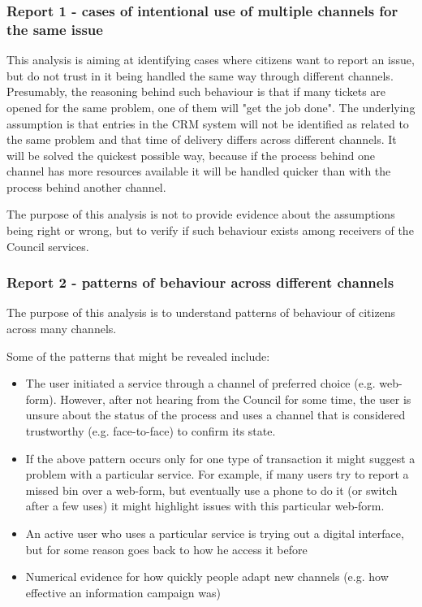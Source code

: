 			\subsubsection{Report 1 - cases of intentional use of multiple channels for the same issue}
			
This analysis is aiming at identifying cases where citizens want to report an issue, but do not trust in it being handled the same way through different channels. Presumably, the reasoning behind such behaviour is that if many tickets are opened for the same problem, one of them will "get the job done". The underlying assumption is that entries in the CRM system will not be identified as related to the same problem and that time of delivery differs across different channels. It will be solved the quickest possible way, because if the process behind one channel has more resources available it will be handled quicker than with the process behind another channel.

The purpose of this analysis is not to provide evidence about the assumptions being right or wrong, but to verify if such behaviour exists among receivers of the Council services.
			
			\subsubsection{Report 2 - patterns of behaviour across different channels}
			
The purpose of this analysis is to understand patterns of behaviour of citizens across many channels.

Some of the patterns that might be revealed include:
\begin{itemize}
\item The user initiated a service through a channel of preferred choice (e.g. web-form). However, after not hearing from the Council for some time, the user is unsure about the status of the process and uses a channel that is considered trustworthy (e.g. face-to-face) to confirm its state.
\item If the above pattern occurs only for one type of transaction it might suggest a problem with a particular service. For example, if many users try to report a missed bin over a web-form, but eventually use a phone to do it (or switch after a few uses) it might highlight issues with this particular web-form.
\item An active user who uses a particular service is trying out a digital interface, but for some reason goes back to how he access it before
\item Numerical evidence for how quickly people adapt new channels (e.g. how effective an information campaign was)
\end{itemize}	
			
